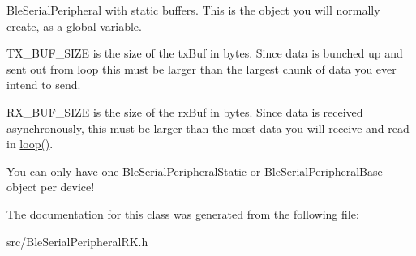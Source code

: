Ble\+Serial\+Peripheral with static buffers. This is the object you will normally create, as a global variable. 

T\+X\+\_\+\+B\+U\+F\+\_\+\+S\+I\+ZE is the size of the tx\+Buf in bytes. Since data is bunched up and sent out from loop this must be larger than the largest chunk of data you ever intend to send.

R\+X\+\_\+\+B\+U\+F\+\_\+\+S\+I\+ZE is the size of the rx\+Buf in bytes. Since data is received asynchronously, this must be larger than the most data you will receive and read in \mbox{\hyperlink{class_ble_serial_peripheral_base_a441dc005092891279967444cb2dc2ff2}{loop()}}.

You can only have one \mbox{\hyperlink{class_ble_serial_peripheral_static}{Ble\+Serial\+Peripheral\+Static}} or \mbox{\hyperlink{class_ble_serial_peripheral_base}{Ble\+Serial\+Peripheral\+Base}} object per device! 

The documentation for this class was generated from the following file\+:\begin{DoxyCompactItemize}
\item 
src/Ble\+Serial\+Peripheral\+R\+K.\+h\end{DoxyCompactItemize}
